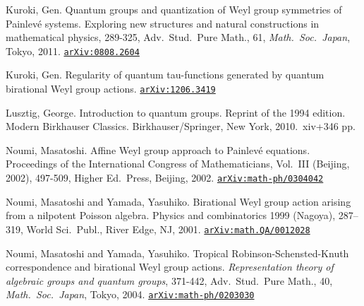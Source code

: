 \documentclass[12pt,twoside,dvipdfm]{msjproc}
\newcommand\arxivref[1]{\href{http://arxiv.org/abs/#1}{\tt arXiv:#1}}
\theoremstyle{definition} %
\theoremstyle{definition} %
\theoremstyle{definition} %
\numberwithin{theorem}{section}
\numberwithin{equation}{section}
\numberwithin{figure}{section}
\numberwithin{table}{section}
\begin{document}
\begin{thebibliography}{99}
Kuroki, Gen. 
Quantum groups and quantization of Weyl group symmetries of Painlev\'e systems. 
{\rm Exploring new structures and natural constructions in mathematical physics}, 289-325, 
Adv.\ Stud.\ Pure Math., 61, {\em Math.\ Soc.\ Japan}, Tokyo, 2011.
\arxivref{0808.2604}

Kuroki, Gen.
Regularity of quantum tau-functions generated by quantum birational Weyl group actions.
\arxivref{1206.3419}

Lusztig, George. 
Introduction to quantum groups. 
Reprint of the 1994  edition.  
Modern Birkhauser Classics. 
Birkhauser/Springer, New York, 2010.\ xiv+346 pp. 

Noumi, Masatoshi.
Affine Weyl group approach to Painlev\'e equations.
Proceedings of the International Congress of Mathematicians, 
Vol.~III (Beijing, 2002), 497-509, Higher Ed.\ Press, Beijing, 2002. 
\arxivref{math-ph/0304042}

Noumi, Masatoshi and Yamada, Yasuhiko.
Birational Weyl group action arising from a nilpotent Poisson algebra. 
Physics and combinatorics 1999 (Nagoya), 287--319, 
World Sci.\ Publ., River Edge, NJ, 2001. 
\arxivref{math.QA/0012028}

Noumi, Masatoshi and Yamada, Yasuhiko.
Tropical Robinson-Schensted-Knuth correspondence and birational Weyl group actions. 
{\em Representation theory of algebraic groups and quantum groups}, 371-442,
Adv.\ Stud.\ Pure Math., 40, {\em Math.\ Soc.\ Japan}, Tokyo, 2004. 
\arxivref{math-ph/0203030}

\end{thebibliography}

\end{document}
